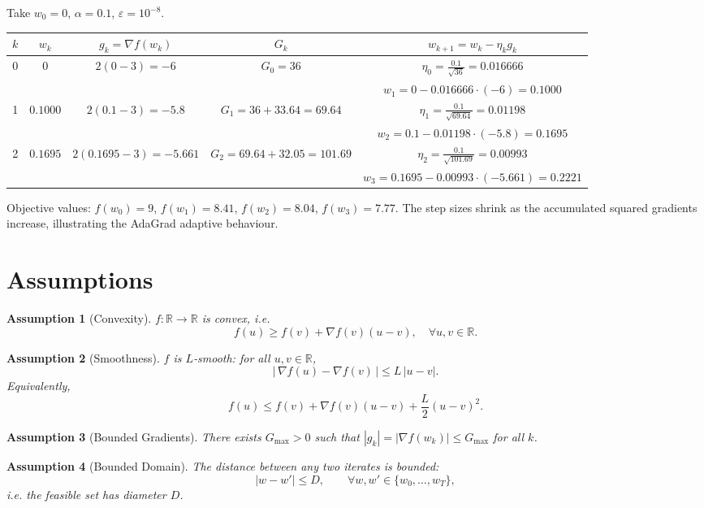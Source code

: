 \documentclass{article}
\newtheorem{assumption}{Assumption}
\newcommand{\R}{\mathbb{R}}
\begin{document}
Take $w_0=0$, $\alpha=0.1$, $\varepsilon=10^{-8}$.
\begin{center}
\begin{tabular}{c|c|c|c|c}
$k$ & $w_k$ & $g_k= \nabla f(w_k)$ & $G_k$ & $w_{k+1}=w_k-\eta_k g_k$\\\hline
0 & $0$ & $2(0-3)=-6$ & $G_0=36$ & $\displaystyle\eta_0=\frac{0.1}{\sqrt{36}}\!=0.016666$\\
  &   &   &   & $w_1=0-0.016666\cdot(-6)=0.1000$\\\hline
1 & $0.1000$ & $2(0.1-3)=-5.8$ & $G_1=36+33.64=69.64$ &
 $\displaystyle\eta_1=\frac{0.1}{\sqrt{69.64}}=0.01198$\\
  &   &   &   & $w_2=0.1-0.01198\cdot(-5.8)=0.1695$\\\hline
2 & $0.1695$ & $2(0.1695-3)=-5.661$ & $G_2=69.64+32.05=101.69$ &
 $\displaystyle\eta_2=\frac{0.1}{\sqrt{101.69}}=0.00993$\\
  &   &   &   & $w_3=0.1695-0.00993\cdot(-5.661)=0.2221$\\\hline
\end{tabular}
\end{center}
Objective values: $f(w_0)=9$, $f(w_1)=8.41$, $f(w_2)=8.04$, $f(w_3)=7.77$.
The step sizes shrink as the accumulated squared gradients increase,
illustrating the AdaGrad adaptive behaviour.

\newpage
\section*{Assumptions}
\begin{assumption}[Convexity]\label{as:convex}
$f:\R\to\R$ is convex, i.e.
\[
f(u)\ge f(v)+\nabla f(v)(u-v),\quad\forall u,v\in\R .
\]
\end{assumption}
\begin{assumption}[Smoothness]\label{as:smooth}
$f$ is $L$‑smooth: for all $u,v\in\R$,
\[
|\,\nabla f(u)-\nabla f(v)\,|\le L\,|u-v|.
\]
Equivalently,
\[
f(u)\le f(v)+\nabla f(v)(u-v)+\frac{L}{2}(u-v)^2 .
\]
\end{assumption}
\begin{assumption}[Bounded Gradients]\label{as:bound}
There exists $G_{\max}>0$ such that $|g_k|=|\nabla f(w_k)|\le G_{\max}$ for all $k$.
\end{assumption}
\begin{assumption}[Bounded Domain]\label{as:diam}
The distance between any two iterates is bounded:
\[
|w-w'|\le D,\qquad\forall w,w'\in\{w_0,\dots,w_T\},
\]
i.e. the feasible set has diameter $D$.
\end{assumption}
\end{document}
